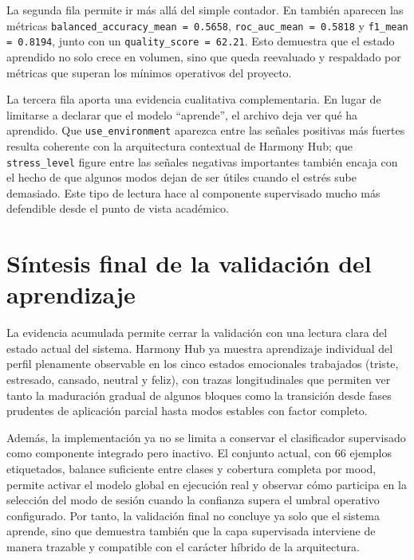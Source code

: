 La segunda fila permite ir más allá del simple contador. En
\texttt{} también aparecen las
métricas \texttt{balanced\_accuracy\_mean = 0.5658},
\texttt{roc\_auc\_mean = 0.5818} y \texttt{f1\_mean = 0.8194}, junto con un
\texttt{quality\_score = 62.21}. Esto demuestra que el estado aprendido no solo
crece en volumen, sino que queda reevaluado y respaldado por métricas que
superan los mínimos operativos del proyecto.

La tercera fila aporta una evidencia cualitativa complementaria. En lugar de
limitarse a declarar que el modelo ``aprende'', el archivo
\texttt{} deja ver qué ha aprendido.
Que \texttt{use\_environment} aparezca entre las señales positivas más fuertes
resulta coherente con la arquitectura contextual de Harmony Hub; que
\texttt{stress\_level} figure entre las señales negativas importantes también
encaja con el hecho de que algunos modos dejan de ser útiles cuando el estrés
sube demasiado. Este tipo de lectura hace al componente supervisado mucho más
defendible desde el punto de vista académico.


\section{Síntesis final de la validación del aprendizaje}
\label{sec:sintesis_final_aprendizaje}

La evidencia acumulada permite cerrar la validación con una lectura clara del
estado actual del sistema. Harmony Hub ya muestra aprendizaje individual del
perfil plenamente observable en los cinco estados emocionales trabajados
(triste, estresado, cansado, neutral y
feliz), con trazas longitudinales que permiten ver tanto la maduración
gradual de algunos bloques como la transición desde fases prudentes de
aplicación parcial hasta modos estables con factor completo.

Además, la implementación ya no se limita a conservar el clasificador
supervisado como componente integrado pero inactivo. El conjunto actual, con 66
ejemplos etiquetados, balance suficiente entre clases y cobertura completa por
mood, permite activar el modelo global en ejecución real y observar cómo
participa en la selección del modo de sesión cuando la confianza supera el
umbral operativo configurado. Por tanto, la validación final no concluye ya
solo que el sistema aprende, sino que demuestra también que la capa
supervisada interviene de manera trazable y compatible con el carácter híbrido
de la arquitectura.

